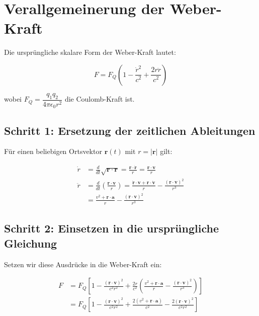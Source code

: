 \newpage
\section{Verallgemeinerung der Weber-Kraft}

Die ursprüngliche skalare Form der Weber-Kraft lautet:

\begin{equation}
F = F_Q \left(1 - \frac{\dot{r}^2}{c^2} + \frac{2r\ddot{r}}{c^2}\right)
\end{equation}

wobei $F_Q = \dfrac{q_1 q_2}{4\pi\epsilon_0 r^2}$ die Coulomb-Kraft ist.

\subsection{Schritt 1: Ersetzung der zeitlichen Ableitungen}

Für einen beliebigen Ortsvektor $\mathbf{r}(t)$ mit $r = |\mathbf{r}|$ gilt:

\begin{align}
\dot{r} &= \frac{d}{dt}\sqrt{\mathbf{r}\cdot\mathbf{r}} = \frac{\mathbf{r}\cdot\dot{\mathbf{r}}}{r} = \frac{\mathbf{r}\cdot\mathbf{v}}{r} \\
\ddot{r} &= \frac{d}{dt}\left(\frac{\mathbf{r}\cdot\mathbf{v}}{r}\right) = \frac{\dot{\mathbf{r}}\cdot\mathbf{v} + \mathbf{r}\cdot\dot{\mathbf{v}}}{r} - \frac{(\mathbf{r}\cdot\mathbf{v})^2}{r^3} \\
&= \frac{v^2 + \mathbf{r}\cdot\mathbf{a}}{r} - \frac{(\mathbf{r}\cdot\mathbf{v})^2}{r^3}
\end{align}

\subsection{Schritt 2: Einsetzen in die ursprüngliche Gleichung}

Setzen wir diese Ausdrücke in die Weber-Kraft ein:

\begin{align}
F &= F_Q \left[1 - \frac{(\mathbf{r}\cdot\mathbf{v})^2}{c^2 r^2} + \frac{2r}{c^2}\left(\frac{v^2 + \mathbf{r}\cdot\mathbf{a}}{r} - \frac{(\mathbf{r}\cdot\mathbf{v})^2}{r^3}\right)\right] \\
&= F_Q \left[1 - \frac{(\mathbf{r}\cdot\mathbf{v})^2}{c^2 r^2} + \frac{2(v^2 + \mathbf{r}\cdot\mathbf{a})}{c^2} - \frac{2(\mathbf{r}\cdot\mathbf{v})^2}{c^2 r^2}\right]
\end{align}

